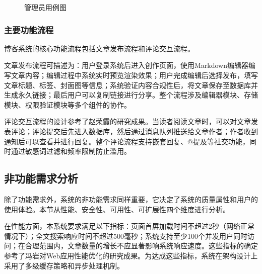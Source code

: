 \documentclass[UTF8,AutoFakeBold=1,AutoFakeSlant,zihao=-4]{SCAU}
\begin{document}
\begin{figure}[H]
\centering
{}
\caption{管理员用例图}
\label{fig:usecase_admin}
\end{figure}


 \subsubsection{主要功能流程}

 博客系统的核心功能流程包括文章发布流程和评论交互流程。

 文章发布流程可描述为：用户登录系统后进入创作页面，使用Markdown编辑器编写文章内容；编辑过程中系统实时预览渲染效果；用户完成编辑后选择发布，填写文章标题、标签、封面图等信息；系统验证内容合规性后，将文章保存至数据库并生成永久链接；最后用户可以复制链接进行分享。整个流程涉及编辑器模块、存储模块、权限验证模块等多个组件的协作。

 评论交互流程的设计参考了赵荣霞{\citep{赵荣霞2018}}的研究成果。当读者阅读文章时，可以对文章发表评论；评论提交后先进入数据库，然后通过消息队列推送给文章作者；作者收到通知后可以查看并进行回复。整个评论流程支持嵌套回复、@提及等社交功能，同时通过敏感词过滤和频率限制防止滥用。

 \subsection{非功能需求分析}

 除了功能需求外，系统的非功能需求同样重要，它决定了系统的质量属性和用户的使用体验。本节从性能、安全性、可用性、可扩展性四个维度进行分析。

 在性能方面，本系统要求满足以下指标：页面首屏加载时间不超过2秒（网络正常情况下）；全文搜索响应时间不超过500毫秒；系统支持至少100个并发用户同时访问；在合理范围内，文章数量的增长不应显著影响系统响应速度。这些指标的确定参考了冯岩{\citep{冯岩2018}}对Web应用性能优化的研究成果。为达成这些指标，系统在架构设计上采用了多级缓存策略和异步处理机制。
\end{document}
